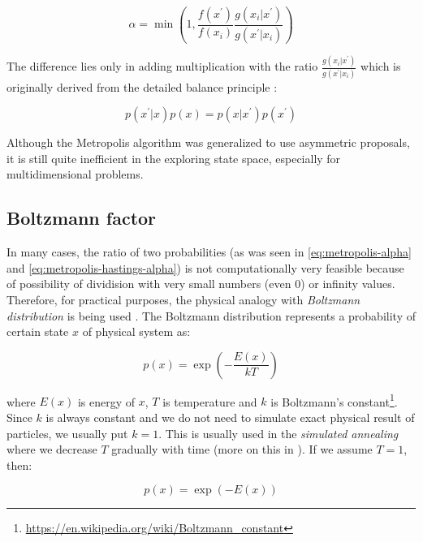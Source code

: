 \documentclass[
  digital, %
  oneside, %
  lof,     %
  lot,     %
]{fithesis4}
\begin{document}
\begin{equation}\label{eq:metropolis-hastings-alpha}
  \alpha = \min \left(1, \frac{f(x^{\prime})}{f(x_{i})} \frac{g(x_{i} | x^{\prime})}{g(x^{\prime} | x_{i})}\right)  
\end{equation}

The difference lies only in adding multiplication
with the ratio $\frac{g(x_{i} | x^{\prime})}{g(x^{\prime} | x_{i})}$
which is originally derived from the detailed balance principle \cite[Chapter 11]{owen2013}:

\begin{equation}
  p(x^\prime | x) p(x) = p(x | x^\prime) p(x^\prime)
\end{equation}

Although the Metropolis algorithm was generalized to
use asymmetric proposals, it is still quite inefficient
in the exploring state space, especially for
multidimensional problems.


\subsection{Boltzmann factor}

In many cases, the ratio of 
two probabilities (as was seen in 
\eqref{eq:metropolis-alpha} and \eqref{eq:metropolis-hastings-alpha}) is not
computationally very feasible because of possibility of dividision 
with very small numbers (even $0$) or infinity values.
Therefore, for practical purposes, the physical analogy with 
\textit{Boltzmann distribution} is being used \cite{murphy2021}.
The Boltzmann distribution represents a probability of 
certain state $x$ of physical system as:

\begin{equation}
  p(x) = \exp \left( -\frac{E(x)}{kT} \right)
\end{equation}

where $E(x)$ is energy of $x$, $T$ is 
temperature and $k$ is Boltzmann's constant\footnote{\url{https://en.wikipedia.org/wiki/Boltzmann_constant}}.
Since $k$ is always constant and we do not need 
to simulate exact physical result of particles, 
we usually put $k = 1$.
This is usually used in the \textit{simulated annealing} where we
decrease $T$ gradually with time (more on this in \cite[Chapter 8]{murphy2021}).
If we assume $T = 1$, then:

\begin{equation}
  p(x) = \exp \left( -E(x) \right)
\end{equation}
\end{document}
